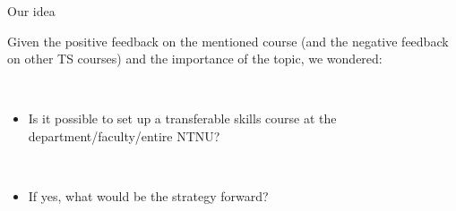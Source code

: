 \documentclass[
  10pt,
  ignorenonframetext,
]{beamer}
\providecommand{\tightlist}{%
  \setlength{\itemsep}{0pt}\setlength{\parskip}{0pt}}
\begin{document}
\begin{frame}
\begin{block}{Our idea}
\protect\hypertarget{our-idea}{}
\(~\)

Given the positive feedback on the mentioned course (and the negative
feedback on other TS courses) and the importance of the topic, we
wondered:

\(~\)

\begin{itemize}
\tightlist
\item
  Is it possible to set up a transferable skills course at the
  department/faculty/entire NTNU?
\end{itemize}

\(~\)

\begin{itemize}
\tightlist
\item
  If yes, what would be the strategy forward?
\end{itemize}
\end{block}
\end{frame}
\end{document}
